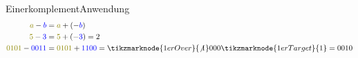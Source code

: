 \documentclass[xelatex,aspectratio=169]{beamer}
\begin{document}
\begin{frame}{Einerkomplement}{Anwendung}
  \begin{align*}
    \textcolor{olive}{a} - \textcolor{blue}{b}       & = \textcolor{olive}{a} + (-\textcolor{blue}{b})                                                                           \\
    \textcolor{olive}{5} - \textcolor{blue}{3}       & = \textcolor{olive}{5} + (-\textcolor{blue}{3}) = 2                                                                       \\
    \textcolor{olive}{0101} - \textcolor{blue}{0011} & = \textcolor{olive}{0101} + \textcolor{blue}{1100} = \tikzmarknode{1erOver}{\not{1}}000\tikzmarknode{1erTarget}{1} = 0010 \\
  \end{align*}
\end{frame}
\end{document}
